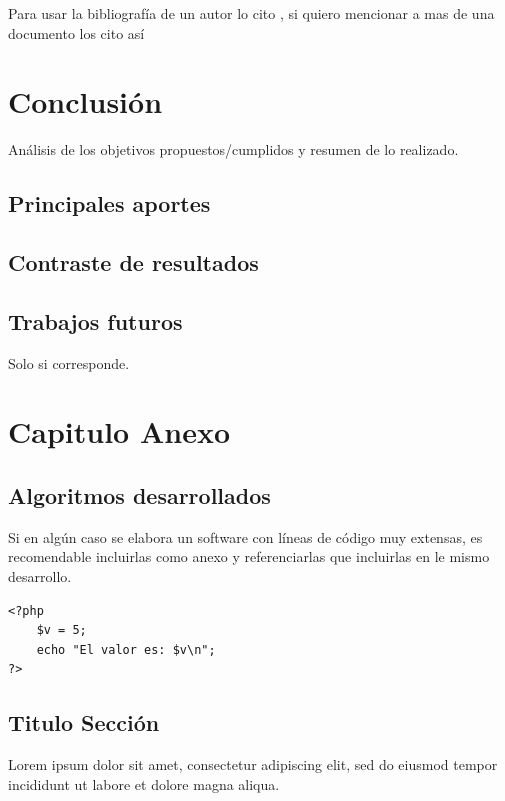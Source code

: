 \documentclass[letter,12pt]{report}
\begin{document}
Para usar la bibliografía de un autor lo cito \cite{DBLPMH10}, si quiero mencionar a mas de una documento los cito  así \cite{ABC02,JanChomicki2008,SN01}


\chapter{Conclusión}
Análisis de los objetivos propuestos/cumplidos y resumen de lo realizado.
\section{Principales aportes}
\section{Contraste de resultados}
\section{Trabajos futuros}
Solo si corresponde.




\renewcommand{\refname}{Referencias}



\renewcommand{\appendixname}{Anexos}
\appendix
\chapter{Capitulo Anexo}
\section{Algoritmos desarrollados}\label{A:01}
Si en algún caso se elabora un software con líneas de código muy extensas, es recomendable incluirlas como anexo y referenciarlas que incluirlas en le mismo desarrollo.

\lstset{language=PHP}
\begin{lstlisting}[caption= C\'odigo PHP de impresi\'on de una variable, label = codPH]
<?php
    $v = 5;
    echo "El valor es: $v\n";
?>
\end{lstlisting}

\section{Titulo Sección}
Lorem ipsum dolor sit amet, consectetur adipiscing elit, sed do eiusmod tempor incididunt ut labore et dolore magna aliqua.
\end{document}
